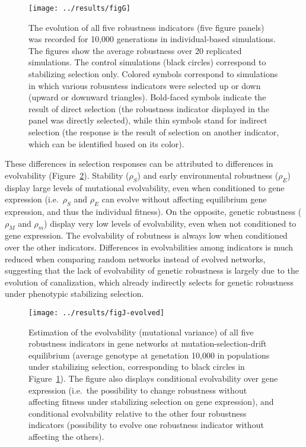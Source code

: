 \documentclass[10pt,a4paper]{article}
\newcommand{\stability}{{\rho_S}}
\newcommand{\earlyenv}{{\rho_E}}
\newcommand{\earlymut}{{\rho_M}}
\newcommand{\latemut}{{\rho_m}}
\begin{document}
\begin{figure}[t]
\begin{adjustwidth}{-1in}{0in}
\begin{flushright}
\texttt{[image: ../results/figG]}
\caption{\color{Gray} \label{fig:evol} The evolution of all five robustness indicators (five figure panels) was recorded for 10,000 generations in individual-based simulations. The figures show the average robustness over 20 replicated simulations. The control simulations (black circles) correspond to stabilizing selection only. Colored symbols correspond to simulations in which various robusntess indicators were selected up or down (upward or downward triangles). Bold-faced symbols indicate the result of direct selection (the robustness indicator displayed in the panel was directly selected), while thin symbols stand for indirect selection (the response is the result of selection on another indicator, which can be identified based on its color). }
\end{flushright}\end{adjustwidth}
\end{figure}

These differences in selection responses can be attributed to differences in evolvability (Figure~\ref{fig:evolvability}). Stability ($\stability$) and early environmental robustness ($\earlyenv$) display large levels of mutational evolvability, even when conditioned to gene expression (i.e.\, $\stability$ and $\earlyenv$ can evolve without affecting equilibrium gene expression, and thus the individual fitness). On the opposite, genetic robustness ($\earlymut$ and $\latemut$) display very low levels of evolvability, even when not conditioned to gene expression. The evolvability of robutness is always low when conditioned over the other indicators. Differences in evolvabilities among indicators is much reduced when comparing random networks instead of evolved networks, suggesting that the lack of evolvability of genetic robustness is largely due to the evolution of canalization, which already indirectly selects for genetic robustness under phenotypic stabilizing selection. 

\begin{figure}[t]
\begin{center}
\texttt{[image: ../results/figJ-evolved]}
\caption{\color{Gray} \label{fig:evolvability} Estimation of the evolvability (mutational variance) of all five robustness indicators in gene networks at mutation-selection-drift equilibrium (average genotype at genetation 10,000 in populations under stabilizing selection, corresponding to black circles in Figure~\ref{fig:evol}). The figure also displays conditional evolvability over gene expression (i.e.\ the possibility to change robustness without affecting fitness under stabilizing selection on gene expression), and conditional evolvability relative to the other four robustness indicators (possibility to evolve one robustness indicator without affecting the others). }
\end{center}
\end{figure}
\end{document}
